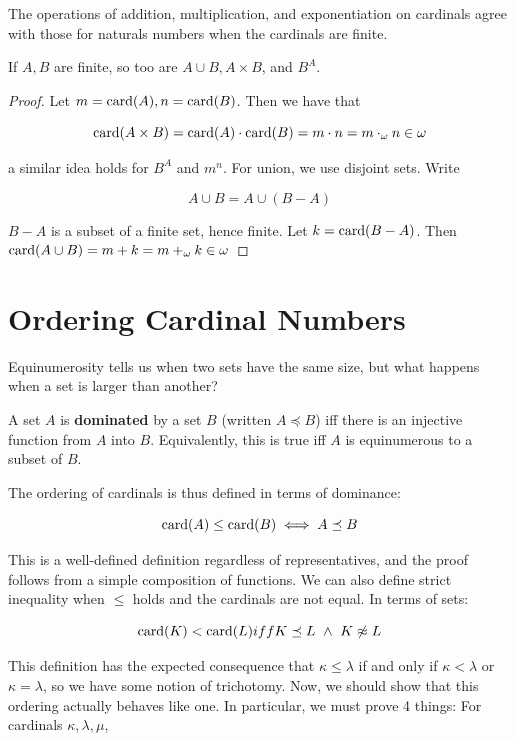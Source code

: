\begin{theorem}
    The operations of addition, multiplication, and exponentiation on cardinals agree with those for naturals numbers when the cardinals are finite.
\end{theorem}

\begin{corollary}
    If $A,B$ are finite, so too are $A \cup B, A \times B$, and $B^A$. 
\end{corollary}

\begin{proof}
    Let $m = \operatorname{card}(A), n = \operatorname{card}(B)$. Then we have that 

    \[\operatorname{card}(A \times B) = \operatorname{card}(A) \cdot \operatorname{card}(B) = m \cdot n = m \cdot_\omega n \in \omega\]

    a similar idea holds for $B^A$ and $m^n$. For union, we use disjoint sets. Write 

    \[A \cup B = A \cup (B - A)\]

    $B - A$ is a subset of a finite set, hence finite. Let $k = \operatorname{card}(B - A)$. Then $\operatorname{card}(A \cup B) = m + k = m +_\omega k \in \omega$
\end{proof}

\section{Ordering Cardinal Numbers}

Equinumerosity tells us when two sets have the same size, but what happens when a set is larger than another? 

\begin{definition}
    A set $A$ is \textbf{dominated} by a set $B$ (written $A \preceq B$) iff there is an injective function from $A$ into $B$. Equivalently, this is true iff $A$ is equinumerous to a subset of $B$.
\end{definition}

The ordering of cardinals is thus defined in terms of dominance: 

\[\operatorname{card}(A) \leq \operatorname{card}(B) \iff A \preceq B\]

This is a well-defined definition regardless of representatives, and the proof follows from a simple composition of functions. We can also define strict inequality when $\leq$ holds and the cardinals are not equal. In terms of sets:

\[\card{K} < \card{L} iff K \preceq L \ \wedge \ K \not\approx L\]

This definition has the expected consequence that $\kappa \leq \lambda$ if and only if $\kappa < \lambda$ or $\kappa = \lambda$, so we have some notion of trichotomy. Now, we should show that this ordering actually behaves like one. In particular, we must prove 4 things: For cardinals $\kappa, \lambda, \mu$,

